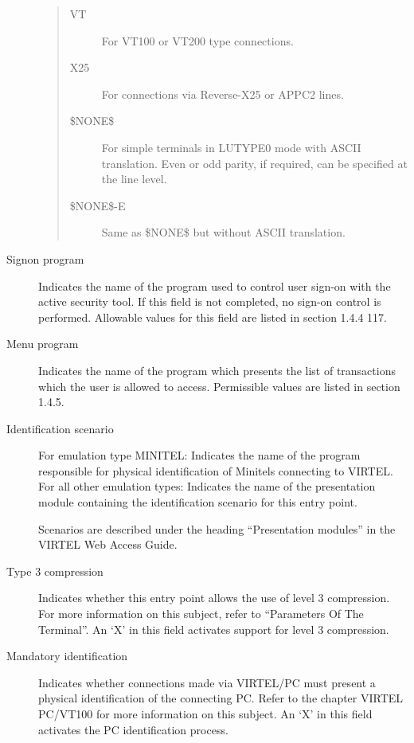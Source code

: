 \documentclass[letterpaper,10pt,english]{sphinxmanual}
\begin{document}
\begin{description}
\begin{quote}
\begin{description}
\item[{VT}] \leavevmode
For VT100 or VT200 type connections.

\item[{X25}] \leavevmode
For connections via Reverse-X25 or APPC2 lines.

\item[{\$NONE\$}] \leavevmode
For simple terminals in LUTYPE0 mode with ASCII translation. Even or odd parity, if required, can be specified at the line level.

\item[{\$NONE\$-E}] \leavevmode
Same as \$NONE\$ but without ASCII translation.

\end{description}
\end{quote}

\item[{Signon program}] \leavevmode
Indicates the name of the program used to control user sign-on with the active security tool. If this field is not completed, no sign-on control is performed. Allowable values for this field are listed in section 1.4.4 117.

\item[{Menu program}] \leavevmode
Indicates the name of the program which presents the list of transactions which the user is allowed to access. Permissible values are listed in section 1.4.5.

\item[{Identification scenario}] \leavevmode
For emulation type MINITEL: Indicates the name of the program responsible for physical identification of Minitels connecting to VIRTEL. For all other emulation types: Indicates the name of the presentation module containing the identification scenario for this entry point.

Scenarios are described under the heading “Presentation modules” in the VIRTEL Web Access Guide.

\item[{Type 3 compression}] \leavevmode
Indicates whether this entry point allows the use of level 3 compression. For more information on this subject, refer to “Parameters Of The Terminal”. An ‘X’ in this field activates support for level 3 compression.

\item[{Mandatory identification}] \leavevmode
Indicates whether connections made via VIRTEL/PC must present a physical identification of the connecting PC. Refer to the chapter VIRTEL PC/VT100 for more information on this subject. An ‘X’ in this field activates the PC identification process.


\end{description}
\end{document}
